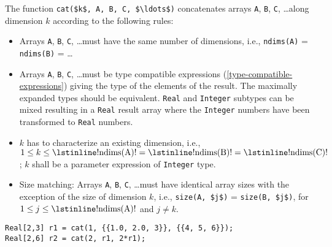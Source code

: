 The function \lstinline!cat($k$, A, B, C, $\ldots$)! concatenates arrays
\lstinline!A!, \lstinline!B!, \lstinline!C!, \ldots along
dimension $k$ according to the following rules:
\begin{itemize}
\item
  Arrays \lstinline!A!, \lstinline!B!, \lstinline!C!, \ldots must have the same number of dimensions, i.e.,
  \lstinline!ndims(A)! = \lstinline!ndims(B)! = \ldots
\item
  Arrays \lstinline!A!, \lstinline!B!, \lstinline!C!, \ldots must be type compatible expressions (\cref{type-compatible-expressions})
  giving the type of the elements of the result. The maximally expanded
  types should be equivalent. \lstinline!Real! and \lstinline!Integer! subtypes can be mixed
  resulting in a \lstinline!Real! result array where the \lstinline!Integer! numbers have been
  transformed to \lstinline!Real! numbers.
\item
  $k$ has to characterize an existing dimension, i.e., $1 \leq k \leq \text{\lstinline!ndims(A)!} = \text{\lstinline!ndims(B)!} = \text{\lstinline!ndims(C)!}$; $k$ shall be a parameter expression of \lstinline!Integer! type.
\item
  Size matching: Arrays \lstinline!A!, \lstinline!B!, \lstinline!C!, \ldots must have identical array sizes
  with the exception of the size of dimension $k$, i.e., \lstinline!size(A, $j$)! =
  \lstinline!size(B, $j$)!, for $1 \leq j \leq \text{\lstinline!ndims(A)!}$ and $j \neq k$.
\end{itemize}

\begin{example}
\begin{lstlisting}[language=modelica]
Real[2,3] r1 = cat(1, {{1.0, 2.0, 3}}, {{4, 5, 6}});
Real[2,6] r2 = cat(2, r1, 2*r1);
\end{lstlisting}
\end{example}

